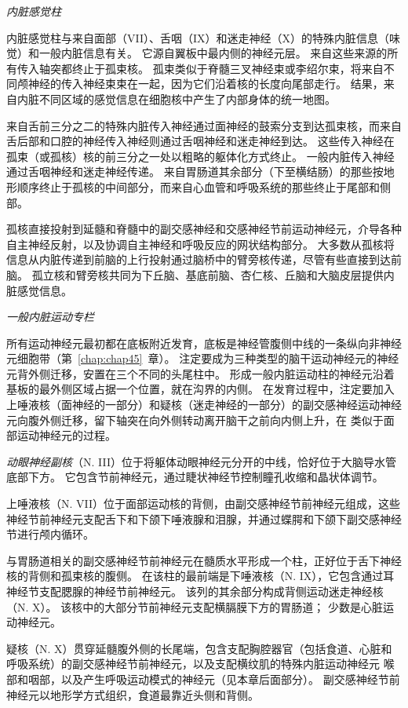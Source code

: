 \textit{内脏感觉柱}

内脏感觉柱与来自面部（VII）、舌咽（IX）和迷走神经（X）的特殊内脏信息（味觉）和一般内脏信息有关。
它源自翼板中最内侧的神经元层。
来自这些来源的所有传入轴突都终止于孤束核。
孤束类似于脊髓三叉神经束或李绍尔束，将来自不同颅神经的传入神经束束在一起，因为它们沿着核的长度向尾部走行。
结果，来自内脏不同区域的感觉信息在细胞核中产生了内部身体的统一地图。


来自舌前三分之二的特殊内脏传入神经通过面神经的鼓索分支到达孤束核，而来自舌后部和口腔的神经传入神经则通过舌咽神经和迷走神经到达。
这些传入神经在孤束（或孤核）核的前三分之一处以粗略的躯体化方式终止。
一般内脏传入神经通过舌咽神经和迷走神经传递。
来自胃肠道其余部分（下至横结肠）的那些按地形顺序终止于孤核的中间部分，而来自心血管和呼吸系统的那些终止于尾部和侧部。


孤核直接投射到延髓和脊髓中的副交感神经和交感神经节前运动神经元，介导各种自主神经反射，以及协调自主神经和呼吸反应的网状结构部分。
大多数从孤核将信息从内脏传递到前脑的上行投射通过脑桥中的臂旁核传递，尽管有些直接到达前脑。
孤立核和臂旁核共同为下丘脑、基底前脑、杏仁核、丘脑和大脑皮层提供内脏感觉信息。


\textit{一般内脏运动专栏}

所有运动神经元最初都在底板附近发育，底板是神经管腹侧中线的一条纵向非神经元细胞带（第~\ref{chap:chap45}~章）。
注定要成为三种类型的脑干运动神经元的神经元背外侧迁移，安置在三个不同的头尾柱中。
形成一般内脏运动柱的神经元沿着基板的最外侧区域占据一个位置，就在沟界的内侧。
在发育过程中，注定要加入上唾液核（面神经的一部分）和疑核（迷走神经的一部分）的副交感神经运动神经元向腹外侧迁移，留下轴突在向外侧转动离开脑干之前向内侧上升，在 类似于面部运动神经元的过程。


\textit{动眼神经副核}（N. III）位于将躯体动眼神经元分开的中线，恰好位于大脑导水管底部下方。
它包含节前神经元，通过睫状神经节控制瞳孔收缩和晶状体调节。


上唾液核（N. VII）位于面部运动核的背侧，由副交感神经节前神经元组成，这些神经节前神经元支配舌下和下颌下唾液腺和泪腺，并通过蝶腭和下颌下副交感神经节进行颅内循环。


与胃肠道相关的副交感神经节前神经元在髓质水平形成一个柱，正好位于舌下神经核的背侧和孤束核的腹侧。
在该柱的最前端是下唾液核（N. IX），它包含通过耳神经节支配腮腺的神经节前神经元。
该列的其余部分构成背侧运动迷走神经核（N. X）。
该核中的大部分节前神经元支配横膈膜下方的胃肠道；
少数是心脏运动神经元。


疑核（N. X）贯穿延髓腹外侧的长尾端，包含支配胸腔器官（包括食道、心脏和呼吸系统）的副交感神经节前神经元，以及支配横纹肌的特殊内脏运动神经元 喉部和咽部，以及产生呼吸运动模式的神经元（见本章后面部分）。
副交感神经节前神经元以地形学方式组织，食道最靠近头侧和背侧。


